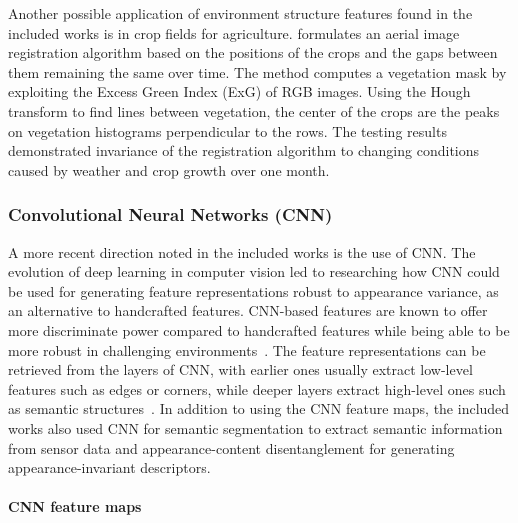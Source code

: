 Another possible application of environment structure features found in the included works is in crop fields for agriculture.
\cite{chebrolu-et-al:2018:2849603} formulates an aerial image registration algorithm based on the positions of the crops and the gaps between them remaining the same over time. The method computes a vegetation mask by exploiting the Excess Green Index (ExG) of RGB images. Using the Hough transform to find lines between vegetation, the center of the crops are the peaks on vegetation histograms perpendicular to the rows.
The testing results demonstrated invariance of the registration algorithm to changing conditions caused by weather and crop growth over one month.



\subsubsection{Convolutional Neural Networks (CNN)}
\label{sec:discussion:appearance:cnn}

A more recent direction noted in the included works is the use of CNN.
The evolution of deep learning in computer vision led to researching how CNN could be used for generating feature representations robust to appearance variance, as an alternative to handcrafted features.
CNN-based features are known to offer more discriminate power compared to handcrafted features while being able to be more robust in challenging environments~\parencite{taisho-kanji:2016:7866383}.
The feature representations can be retrieved from the layers of CNN, with earlier ones usually extract low-level features such as edges or corners, while deeper layers extract high-level ones such as semantic structures~\parencite{chen-et-al:2018:2859916}.
In addition to using the CNN feature maps, the included works also used CNN for semantic segmentation to extract semantic information from sensor data and appearance-content disentanglement for generating appearance-invariant descriptors.


\paragraph{CNN feature maps}

